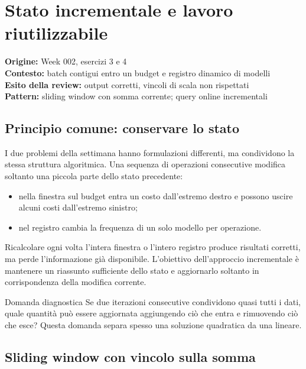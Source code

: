 \chapter[Stato incrementale]{Stato incrementale e lavoro\\riutilizzabile}

\begin{flushleft}
\textbf{Origine:} Week 002, esercizi 3 e 4\\
\textbf{Contesto:} batch contigui entro un budget e registro dinamico di modelli\\
\textbf{Esito della review:} output corretti, vincoli di scala non rispettati\\
\textbf{Pattern:} sliding window con somma corrente; query online incrementali
\end{flushleft}

\section{Principio comune: conservare lo stato}

I due problemi della settimana hanno formulazioni differenti, ma condividono
la stessa struttura algoritmica. Una sequenza di operazioni consecutive
modifica soltanto una piccola parte dello stato precedente:

\begin{itemize}
  \item nella finestra sul budget entra un costo dall'estremo destro e possono
        uscire alcuni costi dall'estremo sinistro;
  \item nel registro cambia la frequenza di un solo modello per operazione.
\end{itemize}

Ricalcolare ogni volta l'intera finestra o l'intero registro produce risultati
corretti, ma perde l'informazione già disponibile. L'obiettivo dell'approccio
incrementale è mantenere un riassunto sufficiente dello stato e aggiornarlo
soltanto in corrispondenza della modifica corrente.

\begin{principlebox}{Domanda diagnostica}
Se due iterazioni consecutive condividono quasi tutti i dati, quale quantità
può essere aggiornata aggiungendo ciò che entra e rimuovendo ciò che esce?
Questa domanda separa spesso una soluzione quadratica da una lineare.
\end{principlebox}

\section{Sliding window con vincolo sulla somma}

